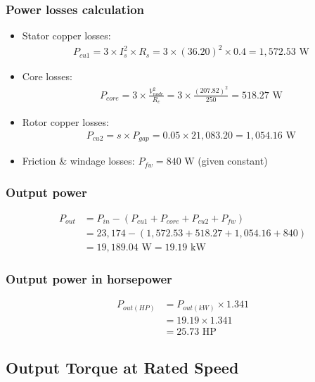 \documentclass[a4paper,12pt]{IEEEtran}
\begin{document}
\subsubsection{Power losses calculation}
\begin{itemize}
    \item Stator copper losses: 
    \begin{align}
        P_{cu1} = 3 \times I_s^2 \times R_s = 3 \times (36.20)^2 \times 0.4 = 1,572.53 \text{ W}
    \end{align}
    
    \item Core losses: 
    \begin{align}
        P_{core} = 3 \times \frac{V_{node}^2}{R_c} = 3 \times \frac{(207.82)^2}{250} = 518.27 \text{ W}
    \end{align}
    
    \item Rotor copper losses: 
    \begin{align}
        P_{cu2} = s \times P_{gap} = 0.05 \times 21,083.20 = 1,054.16 \text{ W}
    \end{align}
    
    \item Friction \& windage losses: $P_{fw} = 840 \text{ W}$ (given constant)
\end{itemize}

\subsubsection{Output power}
\begin{align}
    P_{out} &= P_{in} - (P_{cu1} + P_{core} + P_{cu2} + P_{fw}) \\
    &= 23,174 - (1,572.53 + 518.27 + 1,054.16 + 840) \\
    &= 19,189.04 \text{ W} = 19.19 \text{ kW}
\end{align}

\subsubsection{Output power in horsepower}
\begin{align}
    P_{out(HP)} &= P_{out(kW)} \times 1.341 \\
    &= 19.19 \times 1.341 \\
    &= 25.73 \text{ HP}
\end{align}

\subsection{Output Torque at Rated Speed}
\end{document}
